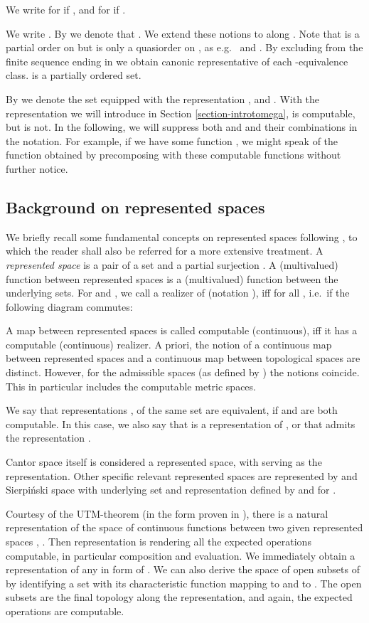 \documentclass{eptcs-modified}
\begin{document}
We write  for  if , and
 for   if
.

 We write . By  we denote that . We extend these notions to  along . Note that  is a partial order on  but is only a quasiorder on , as e.g.~ and . By excluding from  the finite sequence ending in  we obtain canonic representative  of each -equivalence class.   is a partially ordered set.

By  we denote the set  equipped with the representation ,  and .
With the representation we will introduce in Section \ref{section-introtomega},
 is computable, but  is not. In the following, we will suppress both  and  and their combinations in the notation. For example, if we have some function , we might speak of the function  obtained by precomposing with these computable functions without further notice.

\subsection{Background on represented spaces}
We briefly recall some fundamental concepts on represented spaces following \cite{pauly-synthetic}, to which the reader shall also be referred for a more extensive treatment. A \emph{represented space} is a pair  of a set  and a partial surjection . A (multivalued) function between represented spaces is a (multivalued) function between the underlying sets. For  and , we call  a realizer of  (notation ), iff  for all , i.e.~if the following diagram commutes:
 
A map between represented spaces is called computable (continuous), iff it has a computable (continuous) realizer. A priori, the notion of a continuous map between represented spaces and a continuous map between topological spaces are distinct. However, for the admissible spaces (as defined by  \cite{schroder,schroder5}) the notions coincide. This in particular includes the computable metric spaces.

We say that representations ,  of the same set  are equivalent, if  and  are both computable. In this case, we also say that  is a representation of , or that  admits the representation .

Cantor space itself is considered a represented space, with  serving as the representation. Other specific relevant represented spaces are  represented by  and Sierpi\'nski space  with underlying set  and representation  defined by  and  for .

Courtesy of the UTM-theorem (in the form proven in \cite{weihrauchk}), there is a natural representation of the space  of continuous functions between two given represented spaces , . Then representation is rendering all the expected operations computable, in particular composition and evaluation. We immediately obtain a representation of any  in form of . We can also derive the space  of open subsets of  by identifying a set  with its characteristic function  mapping  to  and  to . The open subsets are the final topology along the representation, and again, the expected operations are computable.
\end{document}
